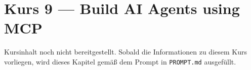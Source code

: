 \chapter{Kurs 9 --- Build AI Agents using MCP}

\begin{luecke}
Kursinhalt noch nicht bereitgestellt. Sobald die Informationen zu diesem Kurs vorliegen,
wird dieses Kapitel gem\"a\ss{} dem Prompt in \texttt{PROMPT.md} ausgef\"ullt.
\end{luecke}

